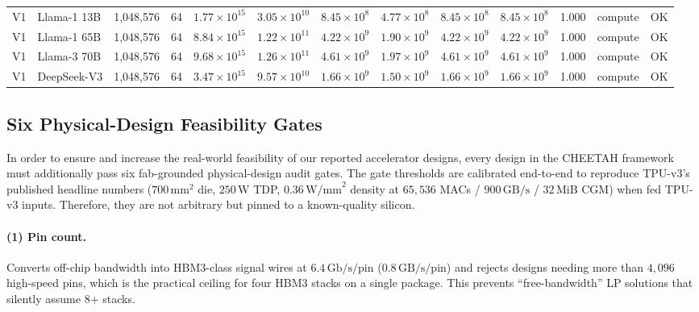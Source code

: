 \begin{table}[ht!]
{\begin{tabular}{llrrrrrrrrrll}
V1 & Llama-1 13B & 1{,}048{,}576 &  64 & $1.77\times10^{15}$ & $3.05\times10^{10}$ & $8.45\times10^{8}$ & $4.77\times10^{8}$ & $8.45\times10^{8}$ & $8.45\times10^{8}$ & 1.000 & compute & OK \\
V1 & Llama-1 65B & 1{,}048{,}576 &  64 & $8.84\times10^{15}$ & $1.22\times10^{11}$ & $4.22\times10^{9}$ & $1.90\times10^{9}$ & $4.22\times10^{9}$ & $4.22\times10^{9}$ & 1.000 & compute & OK \\
V1 & Llama-3 70B & 1{,}048{,}576 &  64 & $9.68\times10^{15}$ & $1.26\times10^{11}$ & $4.61\times10^{9}$ & $1.97\times10^{9}$ & $4.61\times10^{9}$ & $4.61\times10^{9}$ & 1.000 & compute & OK \\
V1 & DeepSeek-V3 & 1{,}048{,}576 &  64 & $3.47\times10^{15}$ & $9.57\times10^{10}$ & $1.66\times10^{9}$ & $1.50\times10^{9}$ & $1.66\times10^{9}$ & $1.66\times10^{9}$ & 1.000 & compute & OK \\
\bottomrule
\end{tabular}%
}
\end{table}


\clearpage
\subsection{Six Physical-Design Feasibility Gates}
\label{app:gates}
In order to ensure and increase the real-world feasibility of our reported accelerator designs, every design in the CHEETAH framework must additionally pass six fab-grounded physical-design audit gates.
The gate thresholds are calibrated end-to-end to reproduce TPU-v3's published headline numbers ($700\,\mathrm{mm}^2$ die, $250\,\mathrm{W}$ TDP, $0.36\,\mathrm{W/mm}^2$ density at $65{,}536$ MACs / $900\,\mathrm{GB/s}$ / $32\,\mathrm{MiB}$ CGM) when fed TPU-v3 inputs. Therefore, they are not arbitrary but pinned to a known-quality silicon.

\paragraph{(1) Pin count.}
Converts off-chip bandwidth into HBM3-class signal wires at $6.4\,\mathrm{Gb/s/pin}$ ($0.8\,\mathrm{GB/s/pin}$) and rejects designs needing more than $4{,}096$ high-speed pins, which is the practical ceiling for four HBM3 stacks on a single package. This prevents ``free-bandwidth'' LP solutions that silently assume 8+ stacks.

